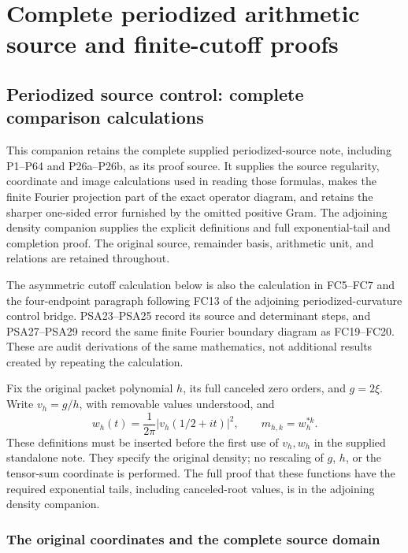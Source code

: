 \begingroup

\section{Complete periodized arithmetic source and finite-cutoff proofs}


\subsection{Periodized source control: complete comparison calculations}
\label{sec:periodized-source-intake-proofs}

This companion retains the complete supplied periodized-source note,
including P1--P64 and P26a--P26b, as its proof source. It supplies the
source regularity, coordinate and image calculations used in reading
those formulas, makes the finite Fourier projection part of the exact
operator diagram, and retains the sharper one-sided error furnished by
the omitted positive Gram. The adjoining density companion supplies the
explicit definitions and full exponential-tail and completion proof.
The original source, remainder basis, arithmetic unit, and relations are
retained throughout.

The asymmetric cutoff calculation below is also the calculation in
FC5--FC7 and the four-endpoint paragraph following FC13 of the adjoining
periodized-curvature control bridge. PSA23--PSA25 record its source
and determinant steps, and PSA27--PSA29 record the same finite Fourier
boundary diagram as FC19--FC20. These
are audit derivations of the same mathematics, not additional results
created by repeating the calculation.

Fix the original packet polynomial $h$, its full canceled zero orders,
and $g=2\xi$. Write $v_h=g/h$, with removable values understood, and
\[
 w_h(t)=\frac{1}{2\pi}|v_h(1/2+it)|^2,
 \qquad m_{h,k}=w_h^{*k}.
 \tag{PSA1}
\]
These definitions must be inserted before the first use of $v_h,w_h$ in
the supplied standalone note. They specify the original density; no
rescaling of $g$, $h$, or the tensor-sum coordinate is performed. The
full proof that these functions have the required exponential tails,
including canceled-root values, is in the adjoining density companion.

\subsubsection{The original coordinates and the complete source domain}


